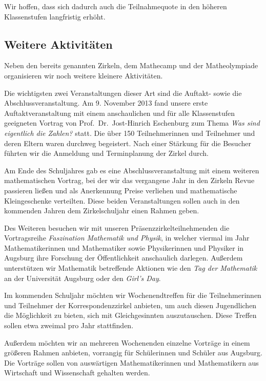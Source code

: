 \documentclass[12pt]{zettel}
\begin{document}
Wir hoffen, dass sich dadurch auch die Teilnahmequote
in den höheren Klassenstufen langfristig erhöht.


\subsection{Weitere Aktivitäten}

Neben den bereits genannten Zirkeln, dem Mathecamp und der
Matheolympiade organisieren wir noch weitere kleinere
Aktivitäten.

Die wichtigsten zwei Veranstaltungen dieser Art sind die Auftakt- sowie die
Abschlussveranstaltung. Am 9. November 2013 fand unsere erste
Auftaktveranstaltung mit einem anschaulichen und für alle Klassenstufen
geeigneten Vortrag von
Prof.~Dr.~Jost-Hinrich Eschenburg zum Thema \emph{Was sind eigentlich die
Zahlen?} statt.
Die über 150 Teilnehmerinnen und Teilnehmer und deren Eltern waren durchweg
begeistert. Nach einer Stärkung für die Besucher führten wir
die Anmeldung und Terminplanung der Zirkel durch.

Am Ende des Schuljahres gab es eine Abschlussveranstaltung mit einem
weiteren mathematischen Vortrag, bei der wir
das vergangene Jahr in den Zirkeln Revue passieren ließen und als Anerkennung
Preise verliehen und mathematische Kleingeschenke verteilten. Diese beiden Veranstaltungen sollen
auch in den kommenden Jahren dem Zirkelschuljahr einen Rahmen geben.

Des Weiteren besuchen wir mit unseren Präsenzzirkelteilnehmenden die
Vortragsreihe \emph{Faszination Mathematik und Physik}, in welcher viermal im
Jahr Mathematikerinnen und Mathematiker sowie Physikerinnen und Physiker in Augsburg ihre Forschung der
Öffentlichkeit anschaulich darlegen. Außerdem unterstützen wir
Mathematik betreffende Aktionen wie den \emph{Tag der Mathematik} an
der Universität Augsburg oder den \emph{Girl's Day}.

Im kommenden Schuljahr möchten wir Wochenendtreffen für die Teilnehmerinnen und
Teilnehmer der Korrespondenzzirkel anbieten, um auch diesen Jugendlichen die
Möglichkeit zu bieten, sich mit Gleichgesinnten auszutauschen. Diese Treffen
sollen etwa zweimal pro Jahr stattfinden.

Außerdem möchten wir an mehreren Wochenenden einzelne Vorträge in einem
größeren Rahmen anbieten, vorrangig für Schülerinnen und Schüler aus Augsburg.
Die Vorträge sollen von auswärtigen Mathematikerinnen und Mathematikern aus
Wirtschaft und Wissenschaft gehalten werden.
\end{document}
